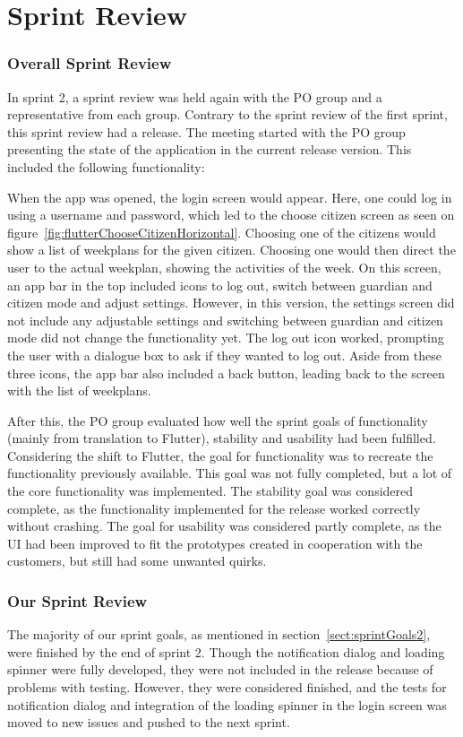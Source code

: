 \section{Sprint Review}
\subsubsection{Overall Sprint Review}
In sprint 2, a sprint review was held again with the PO group and a representative from each group. Contrary to the sprint review of the first sprint, this sprint review had a release. The meeting started with the PO group presenting the state of the application in the current release version. This included the following functionality:

When the app was opened, the login screen would appear. Here, one could log in using a username and password, which led to the choose citizen screen as seen on figure~\ref{fig:flutterChooseCitizenHorizontal}. Choosing one of the citizens would show a list of weekplans for the given citizen. Choosing one would then direct the user to the actual weekplan, showing the activities of the week. On this screen, an app bar in the top included icons to log out, switch between guardian and citizen mode and adjust settings. However, in this version, the settings screen did not include any adjustable settings and switching between guardian and citizen mode did not change the functionality yet. The log out icon worked, prompting the user with a dialogue box to ask if they wanted to log out. Aside from these three icons, the app bar also included a back button, leading back to the screen with the list of weekplans. 

After this, the PO group evaluated how well the sprint goals of functionality (mainly from translation to Flutter), stability and usability had been fulfilled. 
Considering the shift to Flutter, the goal for functionality was to recreate the functionality previously available. This goal was not fully completed, but a lot of the core functionality was implemented.
The stability goal was considered complete, as the functionality implemented for the release worked correctly without crashing. 
The goal for usability was considered partly complete, as the UI had been improved to fit the prototypes created in cooperation with the customers, but still had some unwanted quirks. 

\subsubsection{Our Sprint Review}
The majority of our sprint goals, as mentioned in section~\ref{sect:sprintGoals2}, were finished by the end of sprint 2. Though the notification dialog and loading spinner were fully developed, they were not included in the release because of problems with testing. However, they were considered finished, and the tests for notification dialog and integration of the loading spinner in the login screen was moved to new issues and pushed to the next sprint.

